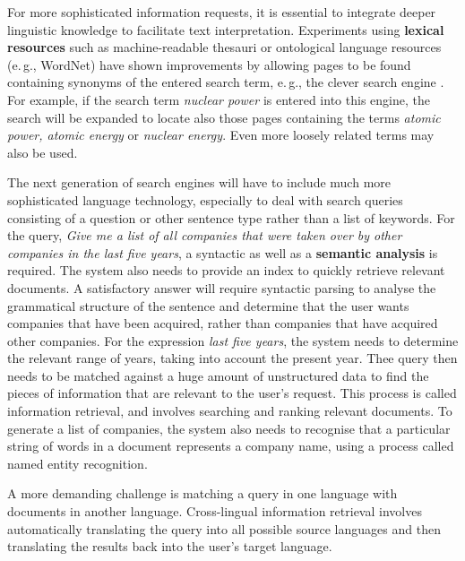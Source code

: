 \begin{multicols}{2}
For more sophisticated information requests, it is essential to integrate deeper linguistic knowledge to facilitate text interpretation. Experiments using \textbf{lexical resources} such as machine-readable thesauri or ontological language resources (e.\,g., WordNet) have shown improvements by allowing pages to be found containing synonyms of the entered search term, e.\,g., the clever search engine \cite{clev}. For example, if the search term \textit{nuclear power} is entered into this engine, the search will be expanded to locate also those pages containing the terms \textit{atomic power, atomic energy} or \textit{nuclear energy}. Even more loosely related terms may also be used.


The next generation of search engines will have to include much more sophisticated language technology, especially to deal with search queries consisting of a question or other sentence type rather than a list of keywords. For the query, \textit{Give me a list of all companies that were taken over by other companies in the last five years}, a syntactic as well as a \textbf{semantic analysis} is required. The system also needs to provide an index to quickly retrieve relevant documents. A satisfactory answer will require syntactic parsing to analyse the grammatical structure of the sentence and determine that the user wants companies that have been acquired, rather than companies that have acquired other companies. For the expression \textit{last five years}, the system needs to determine the relevant range of years, taking into account the present year. Thee query then needs to be matched against a huge amount of unstructured data to find the pieces of information that are relevant to the user’s request. This process is called information retrieval, and involves searching and ranking relevant documents. To generate a list of companies, the system also needs to recognise that a particular string of words in a document represents a company name, using a process called named entity recognition.

A more demanding challenge is matching a query in one language with documents in another language. Cross-lingual information retrieval involves automatically translating the query into all possible source languages and then translating the results back into the user's target language.


\end{multicols}
